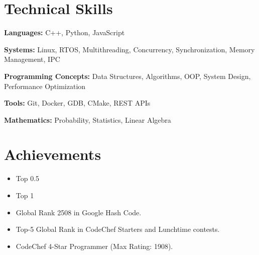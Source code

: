 \documentclass[letterpaper,11pt]{article}
\begin{document}

\section{Technical Skills}

\textbf{Languages:}
C++, Python, JavaScript

\textbf{Systems:}
Linux, RTOS, Multithreading, Concurrency, Synchronization, Memory Management, IPC

\textbf{Programming Concepts:}
Data Structures, Algorithms, OOP, System Design, Performance Optimization

\textbf{Tools:}
Git, Docker, GDB, CMake, REST APIs

\textbf{Mathematics:}
Probability, Statistics, Linear Algebra


\section{Achievements}

\begin{itemize}[leftmargin=*]
\item Top 0.5%
\item Top 1%
\item Global Rank 2508 in Google Hash Code.
\item Top-5 Global Rank in CodeChef Starters and Lunchtime contests.
\item CodeChef 4-Star Programmer (Max Rating: 1908).
\end{itemize}
\end{document}
